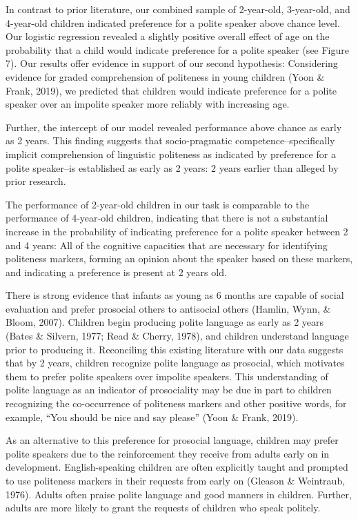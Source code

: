 \documentclass[
  english,
  man,floatsintext]{apa6}
\begin{document}
In contrast to prior literature, our combined sample of 2-year-old, 3-year-old, and 4-year-old children indicated preference for a polite speaker above chance level. Our logistic regression revealed a slightly positive overall effect of age on the probability that a child would indicate preference for a polite speaker (see Figure 7). Our results offer evidence in support of our second hypothesis: Considering evidence for graded comprehension of politeness in young children (Yoon \& Frank, 2019), we predicted that children would indicate preference for a polite speaker over an impolite speaker more reliably with increasing age.

Further, the intercept of our model revealed performance above chance as early as 2 years. This finding suggests that socio-pragmatic competence--specifically implicit comprehension of linguistic politeness as indicated by preference for a polite speaker--is established as early as 2 years: 2 years earlier than alleged by prior research.

The performance of 2-year-old children in our task is comparable to the performance of 4-year-old children, indicating that there is not a substantial increase in the probability of indicating preference for a polite speaker between 2 and 4 years: All of the cognitive capacities that are necessary for identifying politeness markers, forming an opinion about the speaker based on these markers, and indicating a preference is present at 2 years old.

There is strong evidence that infants as young as 6 months are capable of social evaluation and prefer prosocial others to antisocial others (Hamlin, Wynn, \& Bloom, 2007). Children begin producing polite language as early as 2 years (Bates \& Silvern, 1977; Read \& Cherry, 1978), and children understand language prior to producing it. Reconciling this existing literature with our data suggests that by 2 years, children recognize polite language as prosocial, which motivates them to prefer polite speakers over impolite speakers. This understanding of polite language as an indicator of prosociality may be due in part to children recognizing the co-occurrence of politeness markers and other positive words, for example, ``You should be nice and say please'' (Yoon \& Frank, 2019).

As an alternative to this preference for prosocial language, children may prefer polite speakers due to the reinforcement they receive from adults early on in development. English-speaking children are often explicitly taught and prompted to use politeness markers in their requests from early on (Gleason \& Weintraub, 1976). Adults often praise polite language and good manners in children. Further, adults are more likely to grant the requests of children who speak politely.
\end{document}
